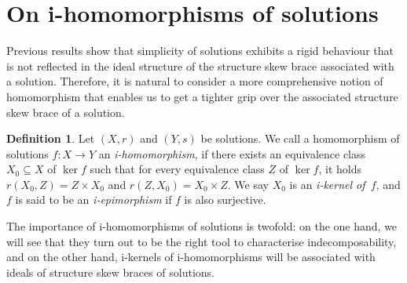 \documentclass[12pt, a4paper, english]{article}
\theoremstyle{definition}
\newtheorem{definicio}[teorema]{Definition}
\theoremstyle{remark}
\newtheorem*{nota}{Remark}
\begin{document}
\section{On i-homomorphisms of solutions}
\label{sec:imorphisms}

Previous results show that simplicity of solutions exhibits a rigid behaviour that is not reflected in the ideal structure of the structure skew brace associated with a solution. Therefore, it is natural to consider a more comprehensive notion of homomorphism that enables us to get a tighter grip over %
the associated structure skew brace of a solution.



\begin{definicio}
\label{def:i-homomorf}
Let $(X,r)$ and $(Y,s)$ be solutions. We call a homomorphism of solutions $f\colon X \rightarrow Y$  an \emph{i-homomorphism}, if there exists an equivalence class $X_0\subseteq X$ of $\ker f$ such that for every equivalence class $Z$ of $\ker f$, it holds $r(X_0,Z) = Z \times X_0$ and $r(Z,X_0) = X_0\times Z$. We say $X_0$ is an \emph{i-kernel of~$f$}, and $f$ is said to be an \emph{i-epimorphism} if $f$ is also surjective.
\end{definicio}

The importance of i-homomorphisms of solutions is twofold: on the one hand, we will see that they turn out to be the right tool to characterise indecomposability, and on the other hand, i-kernels of i-homomorphisms will be associated with ideals of structure skew braces of solutions.


\end{document}

